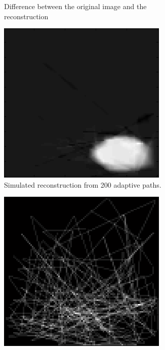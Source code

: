 \documentclass[english]{article}\usepackage[]{graphicx}\usepackage[]{color}
\begin{document}
\begin{figure}[H]
\begin{subfigure}{.22\textwidth}
  \caption{Difference between the original image and the reconstruction}
  \vspace{10pt}
  \label{fig:adp_randpaths_diff}
\end{subfigure}%
\caption{Simulated reconstruction using random paths as before.}
\label{fig:adp_randpaths_fig}
\begin{subfigure}{.22\textwidth}
  \centering
    \includegraphics[width=1\linewidth]{figures/adaptiveresultrec}
  \caption{Simulated reconstruction from 200 adaptive paths.}
  \vspace{0pt}
  \label{fig:adp_adpaths_sim_rec}
\end{subfigure}%
\hspace{10pt}
\begin{subfigure}{.22\textwidth}
  \centering
    \includegraphics[width=1\linewidth]{figures/adaptiveresultpath}

\end{subfigure}
\end{figure}
\end{document}
